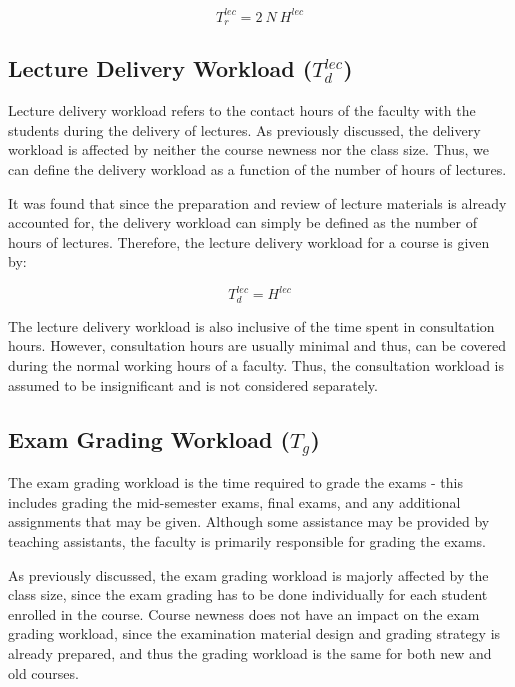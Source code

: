 \begin{equation}
  \label{eqn:review-workload-total}
  T_r^{lec} = 2\ N \ H^{lec}
\end{equation}


\subsection{Lecture Delivery Workload (\(T_d^{lec}\))}

Lecture delivery workload refers to the contact hours of the faculty with the students during the delivery of lectures. As previously discussed, the delivery workload is affected by neither the course newness nor the class size. Thus, we can define the delivery workload as a function of the number of hours of lectures.

It was found that since the preparation and review of lecture materials is already accounted for, the delivery workload can simply be defined as the number of hours of lectures. Therefore, the lecture delivery workload for a course is given by:

\begin{equation}
  \label{eqn:lecture-delivery-workload}
  T_d^{lec} = H^{lec}
\end{equation}

The lecture delivery workload is also inclusive of the time spent in consultation hours. However, consultation hours are usually minimal and thus, can be covered during the normal working hours of a faculty. Thus, the consultation workload is assumed to be insignificant and is not considered separately.

\subsection{Exam Grading Workload (\(T_g\))}
\label{sec:exam_grading}

The exam grading workload is the time required to grade the exams - this includes grading the mid-semester exams, final exams, and any additional assignments that may be given. Although some assistance may be provided by teaching assistants, the faculty is primarily responsible for grading the exams.

As previously discussed, the exam grading workload is majorly affected by the class size, since the exam grading has to be done individually for each student enrolled in the course. Course newness does not have an impact on the exam grading workload, since the examination material design and grading strategy is already prepared, and thus the grading workload is the same for both new and old courses.

